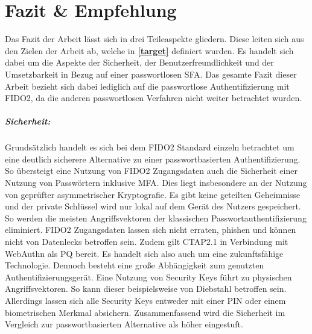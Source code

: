 
\chapter{Fazit \& Empfehlung}
Das Fazit der Arbeit lässt sich in drei Teileaspekte gliedern. Diese leiten sich aus den Zielen der Arbeit ab, welche in \textbf{\ref{target}} definiert wurden. Es handelt sich dabei um die Aspekte der Sicherheit, der Benutzerfreundlichkeit und der Umsetzbarkeit in Bezug auf einer passwortlosen \ac{SFA}. Das gesamte Fazit dieser Arbeit bezieht sich dabei lediglich auf die passwortlose Authentifizierung mit \ac{FIDO}2, da die anderen passwortlosen Verfahren nicht weiter betrachtet wurden.

\paragraph*{Sicherheit:} Grundsätzlich handelt es sich bei dem \ac{FIDO}2 Standard einzeln betrachtet um eine deutlich sicherere Alternative zu einer passwortbasierten Authentifizierung. So übersteigt eine Nutzung von \ac{FIDO}2 Zugangsdaten auch die Sicherheit einer Nutzung von Passwörtern inklusive \ac{MFA}. Dies liegt insbesondere an der Nutzung von geprüfter asymmetrischer Kryptografie. Es gibt keine geteilten Geheimnisse und der private Schlüssel wird nur lokal auf dem Gerät des Nutzers gespeichert. So werden die meisten Angriffsvektoren der klassischen Passwortauthentifizierung eliminiert. \ac{FIDO}2 Zugangsdaten lassen sich nicht erraten, phishen und können nicht von Datenlecks betroffen sein. Zudem gilt CTAP2.1 in Verbindung mit WebAuthn als \ac{PQ} bereit. Es handelt sich also auch um eine zukunftsfähige Technologie. Dennoch besteht eine große Abhängigkeit zum genutzten Authentifizierungsgerät. Eine Nutzung von Security Keys führt zu physischen Angriffsvektoren. So kann dieser beispielsweise von Diebstahl betroffen sein. Allerdings lassen sich alle Security Keys entweder mit einer PIN oder einem biometrischen Merkmal absichern. Zusammenfassend wird die Sicherheit im Vergleich zur passwortbasierten Alternative als höher eingestuft.

